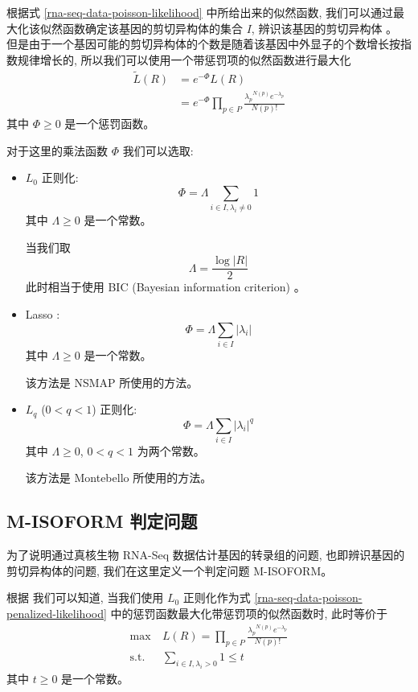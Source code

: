 根据式 \eqref{rna-seq-data-poisson-likelihood} 中所给出来的似然函数, 
我们可以通过最大化该似然函数确定该基因的剪切异构体的集合 $I$, 
辨识该基因的剪切异构体 \cite{xing2006expectation}。 
但是由于一个基因可能的剪切异构体的个数是随着该基因中外显子的个数增长按指数规律增长的, 
所以我们可以使用一个带惩罚项的似然函数进行最大化
\begin{align}
\tilde{L}(R) &= e^{-\Phi} L(R) \nonumber \\ 
\label{rna-seq-data-poisson-penalized-likelihood}
&= e^{-\Phi} \prod_{p\in P} \frac{{\lambda_p}^{N(p)} e^{-\lambda_p}}{N(p)!}
\end{align}
其中 $\Phi \geq 0$ 是一个惩罚函数。 

对于这里的乘法函数 $\Phi$ 我们可以选取: 
\begin{itemize}
\item $L_0$ 正则化:
\[
\Phi = \Lambda \sum_{i \in I, \lambda_i \neq 0} 1
\]
其中 $\Lambda \geq 0$ 是一个常数。 

当我们取 
\[
\Lambda = \frac{\log |R|}{2}
\]
此时相当于使用 BIC (Bayesian information criterion) \cite{BIC.Schwarz_1978}。 

\item Lasso \cite{tibshirani1996regression}:
\[
\Phi = \Lambda \sum_{i \in I} |\lambda_i|
\]
其中 $\Lambda \geq 0$ 是一个常数。 

该方法是 NSMAP \cite{nsmap.21575225} 所使用的方法。 

\item $L_q$ ($0<q<1$) 正则化:
\[
\Phi = \Lambda \sum_{i \in I} |\lambda_i|^q
\]
其中 $\Lambda \geq 0$, $0 <q<1$ 为两个常数。 

该方法是 Montebello \cite{Hiller.Montebello} 所使用的方法。 
\end{itemize}

\subsection{M-ISOFORM 判定问题}
为了说明通过真核生物 RNA-Seq 数据估计基因的转录组的问题, 
也即辨识基因的剪切异构体的问题, 我们在这里定义一个判定问题 M-ISOFORM。 

根据  我们可以知道, 
当我们使用 $L_0$ 正则化作为式 \eqref{rna-seq-data-poisson-penalized-likelihood} 
中的惩罚函数最大化带惩罚项的似然函数时, 此时等价于
\begin{align}
\max &\ L(R) =  \prod_{p\in P} \frac{{\lambda_p}^{N(p)} e^{-\lambda_p}}{N(p)!} \nonumber \\
\label{rna-seq-data-likelihood-1}
\text{s.t.} &\  \sum_{i \in I, \lambda_i>0} 1 \leq t
\end{align}
其中 $t\geq 0$ 是一个常数。 

